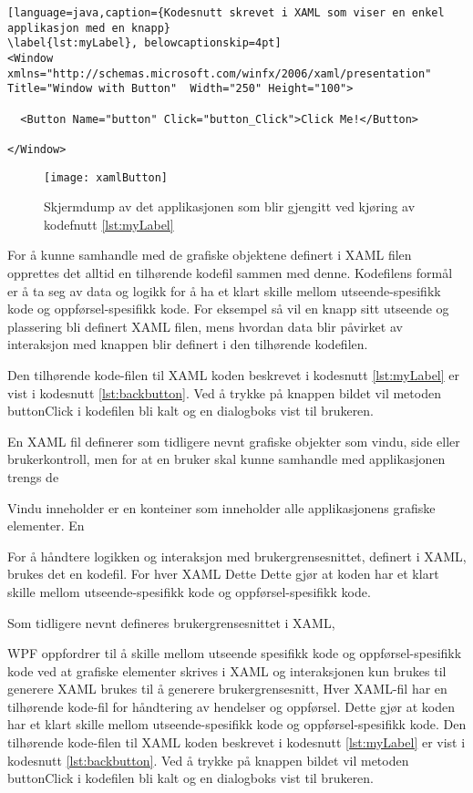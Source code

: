 \begin{lstlisting}[language=java,caption={Kodesnutt skrevet i XAML som viser en enkel applikasjon med en knapp}
\label{lst:myLabel}, belowcaptionskip=4pt]
<Window xmlns="http://schemas.microsoft.com/winfx/2006/xaml/presentation" Title="Window with Button"  Width="250" Height="100">

  <Button Name="button" Click="button_Click">Click Me!</Button>
  
</Window>
\end{lstlisting}



\begin{figure}[ht!]
\centering
\texttt{[image: xamlButton]}
\caption{Skjermdump av det applikasjonen som blir gjengitt ved kjøring av kodefnutt \ref{lst:myLabel}}
\label{fig:xamlButton}
\end{figure}


For å kunne samhandle med de grafiske objektene definert i XAML filen opprettes det alltid en tilhørende kodefil sammen med denne. Kodefilens formål er å ta seg av data og logikk for å ha et klart skille mellom utseende-spesifikk kode og oppførsel-spesifikk kode. For eksempel så vil en knapp sitt utseende og plassering bli definert XAML filen, mens hvordan data blir påvirket av interaksjon med knappen blir definert i den tilhørende kodefilen.



Den tilhørende kode-filen til XAML koden beskrevet i kodesnutt \ref{lst:myLabel} er vist i kodesnutt \ref{lst:backbutton}. Ved å trykke på knappen bildet vil metoden button\textunderscore Click i kodefilen bli kalt og en dialogboks vist til brukeren.

En XAML fil definerer som tidligere nevnt grafiske objekter som vindu, side eller brukerkontroll, men for at en bruker skal kunne samhandle med applikasjonen trengs de


Vindu inneholder er en konteiner som inneholder alle applikasjonens grafiske elementer. En

For å håndtere logikken og interaksjon med brukergrensesnittet,  definert i XAML, brukes det en kodefil. For hver XAML   Dette Dette gjør at koden har et klart skille mellom utseende-spesifikk kode og oppførsel-spesifikk kode.

Som tidligere nevnt defineres brukergrensesnittet i XAML,

WPF oppfordrer til å skille mellom utseende spesifikk kode og oppførsel-spesifikk kode ved at grafiske elementer skrives i XAML og interaksjonen  kun brukes til generere 
XAML brukes til å generere brukergrensesnitt, 
Hver XAML-fil har en tilhørende kode-fil for håndtering av hendelser og oppførsel. Dette gjør at koden har et klart skille mellom utseende-spesifikk kode og oppførsel-spesifikk kode. Den tilhørende kode-filen til XAML koden beskrevet i kodesnutt \ref{lst:myLabel} er vist i kodesnutt \ref{lst:backbutton}. Ved å trykke på knappen bildet vil metoden button\textunderscore Click i kodefilen bli kalt og en dialogboks vist til brukeren.

